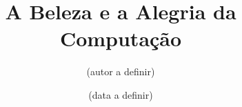 \documentclass[12pt]{book}
\begin{document}
\frontmatter
\title{A Beleza e a Alegria da Computação}
\author{(autor a definir)}
\date{(data a definir)}
\maketitle
%
\tableofcontents
%
%

\mainmatter



%


%



\end{document}
